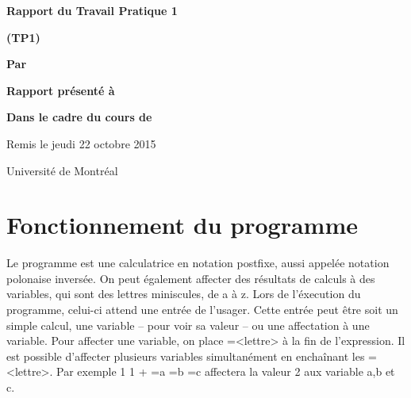 \documentclass[letterpaper,12pt]{scrartcl}
\begin{document}
	\begin{center}
		\vspace{2cm}

		{\Huge\bf\sf Rapport du Travail Pratique 1}

		\vspace{0.5cm}

		{\bf\sf (TP1)}

		\vspace{4cm}

		{\bf\sf Par}

		\vspace{0.5cm}{\large\bf\sf Sulliman Aïad et François Poitras}

		\vspace{2cm}

		{\bf\sf Rapport présenté à}

		\vspace{0.5cm}{\large\bf\sf M. Marc  Feeley}

		\vspace{2cm}

		{\bf\sf Dans le cadre du cours de}

		\vspace{0.5cm}{\large\bf\sf Concepts des langages de programmation (IFT2035)}

		\vspace{\fill}
		Remis le jeudi 22 octobre 2015

		\vspace{0.5cm}Université de Montréal
	\end{center}
	
	\newpage

	\pagestyle{cb}
	
	\tableofcontents

	\newpage
	
	\section{Fonctionnement du programme}
		Le programme est une calculatrice en notation postfixe, aussi appelée notation polonaise inversée. On peut également affecter des résultats de calculs à des variables, qui sont des lettres miniscules, de a à z. Lors de l'éxecution du programme, celui-ci attend une entrée de l'usager. Cette entrée peut être soit un simple calcul, une variable -- pour voir sa valeur -- ou une affectation à une variable. Pour affecter une variable, on place =<lettre> à la fin de l'expression. Il est possible d'affecter plusieurs variables simultanément en enchaînant les =<lettre>. Par exemple 1 1 + =a =b =c affectera la valeur 2 aux variable a,b et c. 
\end{document}
